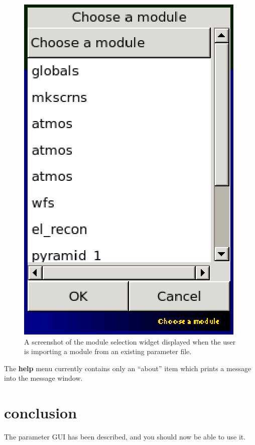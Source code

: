 \documentclass{article}
\begin{document}
\begin{figure}
\includegraphics{pics/paramguimodule.eps}
\caption{A screenshot of the module selection widget displayed when
  the user is importing a module from an existing parameter file.}
\label{fig:paramguimodule}
\end{figure}

The {\bf help} menu currently contains only an ``about'' item which
prints a message into the message window.

\section{conclusion}
The parameter GUI has been described, and you should now be able to
use it.  


\printindex
\end{document}

